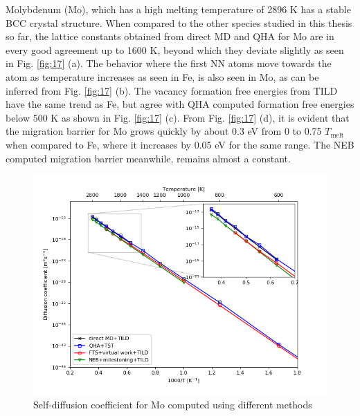 \documentclass{article}
\begin{document}
Molybdenum (Mo), which has a high melting temperature of 2896 K has a stable BCC crystal structure. When compared to the other species studied in this thesis so far, the lattice constants obtained from direct MD and QHA for Mo are in every good agreement up to 1600 K, beyond which they deviate slightly as seen in Fig. \ref{fig:17} (a). The behavior where the first NN atoms move towards the atom as temperature increases as seen in Fe, is also seen in Mo, as can be inferred from Fig. \ref{fig:17} (b). The vacancy formation free energies from TILD have the same trend as Fe, but agree with QHA computed formation free energies below 500 K as shown in Fig. \ref{fig:17} (c). From Fig. \ref{fig:17} (d), it is evident that the migration barrier for Mo grows quickly by about 0.3 eV from 0 to 0.75 $T_{\mathrm{melt}}$ when compared to Fe, where it increases by 0.05 eV for the same range. The NEB computed migration barrier meanwhile, remains almost a constant.

\begin{figure}[htp]
\centering
\includegraphics[scale=0.65]{mo_self_diffusion}
\caption{Self-diffusion coefficient for Mo computed using different methods}
\label{fig:18}
\end{figure}
\end{document}
